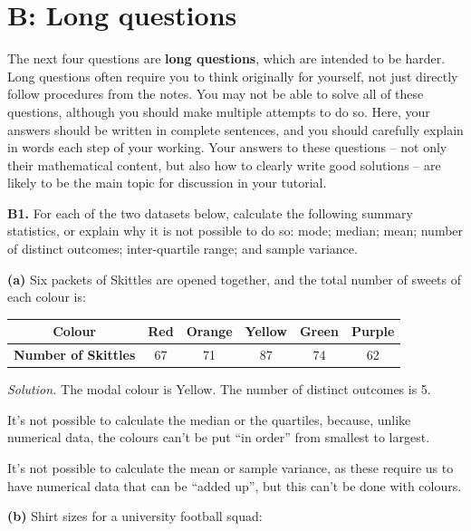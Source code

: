 \documentclass[
  a4paper,
]{book}
\theoremstyle{definition}
\theoremstyle{definition}
\theoremstyle{definition}
\theoremstyle{definition}
\theoremstyle{remark}
\begin{document}
\hypertarget{P1-long}{%
\section*{B: Long questions}\label{P1-long}}

The next four questions are \textbf{long questions}, which are intended to be harder. Long questions often require you to think originally for yourself, not just directly follow procedures from the notes. You may not be able to solve all of these questions, although you should make multiple attempts to do so. Here, your answers should be written in complete sentences, and you should carefully explain in words each step of your working. Your answers to these questions -- not only their mathematical content, but also how to clearly write good solutions -- are likely to be the main topic for discussion in your tutorial.

\textbf{B1.} For each of the two datasets below, calculate the following summary statistics, or explain why it is not possible to do so: mode; median; mean; number of distinct outcomes; inter-quartile range; and sample variance.

\textbf{(a)} Six packets of Skittles are opened together, and the total number of sweets of each colour is:

\begin{longtable}[]{@{}cccccc@{}}
\toprule()
\textbf{Colour} & Red & Orange & Yellow & Green & Purple \\
\midrule()
\endhead
\textbf{Number of Skittles} & 67 & 71 & 87 & 74 & 62 \\
\bottomrule()
\end{longtable}

\begin{myanswers}
\emph{Solution.}
The modal colour is Yellow. The number of distinct outcomes is 5.

It's not possible to calculate the median or the quartiles, because, unlike numerical data, the colours can't be put ``in order'' from smallest to largest.

It's not possible to calculate the mean or sample variance, as these require us to have numerical data that can be ``added up'', but this can't be done with colours.

\end{myanswers}

\textbf{(b)} Shirt sizes for a university football squad:
\end{document}
